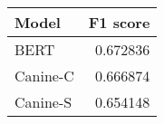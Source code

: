\begin{tabular}{lr}
\toprule
   Model &  F1 score \\
\midrule
    BERT &  0.672836 \\
Canine-C &  0.666874 \\
Canine-S &  0.654148 \\
\bottomrule
\end{tabular}

